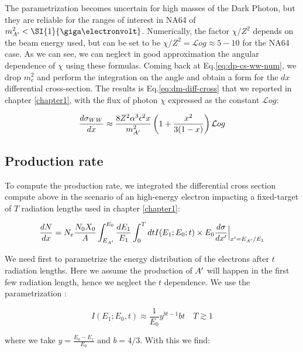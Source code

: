  The parametrization becomes uncertain for high masses of the Dark Photon, but they are reliable for the ranges of interest in NA64 of $m^2_{\DM} < \SI{1}{\giga\electronvolt}$. Numerically, the factor $\chi / Z^2$ depends on the beam energy used, but can be set to be $\chi/Z^2 = \mathcal{L}og \approx 5-10$ for the NA64 case. As we can see, we can neglect in good approximation the angular dependence of $\chi$ using these formulas. Coming back at Eq.\ref{eq:dp-cs-ww-num}, we drop $m^2_e$ and perform the integration on the angle and obtain a form for the $dx$ differential cross-section. The results is Eq.\ref{eq:dm-diff-cross} that we reported in chapter \ref{chapter1}, with the flux of photon $\chi$ expressed as the constant $\mathcal{L}og$:

 \begin{equation}
   \label{eq:dp-cs-dx}
\frac{d\sigma_{WW}}{dx} \approx \frac{8 Z^2 \alpha^3 \epsilon^2 x}{m^2_{A'}} \left( 1 + \frac{x^2}{3(1-x)} \right) \mathcal{L}og    
\end{equation}


\subsection{Production rate}
\label{appA:sec:production-rate}

To compute the production rate, we integrated the differential cross section compute above in the scenario of an high-energy electron impacting a fixed-target of $T$ radiation lengths used in chapter \ref{chapter1}:


\begin{equation}
  \label{eq:dm-gy}
  \frac{dN}{dx} = N_e \frac{N_0 X_0}{A} \int_{E_{A'}}^{E_0} \frac{dE_1}{E_1} \int_0^T dt I(E_1;E_0;t) \times E_0 \frac{d\sigma}{dx'}\Big|_{x' = E_{A'}/E_1}
\end{equation}

We need first to parametrize the energy distribution of the electrons after $t$ radiation lengths. Here we assume the production of $A'$ will happen in the first few radiation length, hence we neglect the $t$ dependence. We use the parametrization \cite{jdb}:

\begin{equation}
  \label{eq:i-dist}
  I(E_1;E_0,t) \approx  \frac{1}{E_0} y^{bt-1} bt \quad T \gtrsim 1
\end{equation}

where we take $y = \frac{E_0 - E_1}{E_0}$ and $b=4/3$. With this we find:

